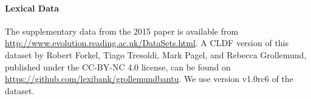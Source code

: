 \documentclass[]{rsos}%
\begin{document}
\paragraph{Lexical Data}
The supplementary data from the 2015 paper \parencite{grollemund2015bantu} is available from
\url{http://www.evolution.reading.ac.uk/DataSets.html}. A CLDF version of this dataset by Robert Forkel, Tiago Tresoldi, Mark Pagel, and Rebecca Grollemund, published under the CC-BY-NC 4.0 license, can be found on \url{https://github.com/lexibank/grollemundbantu}. We use version v1.0rc6 of the dataset.
\end{document}
